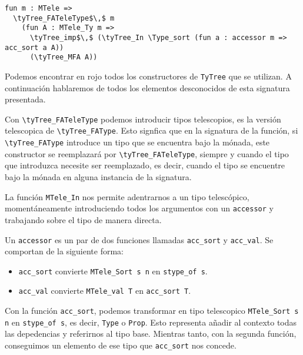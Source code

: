 \begin{lstlisting}[frame=tb,caption={\lstinline{ret} lifteado},label=lst:ret_lift_m]
fun m : MTele =>
  \tyTree_FATeleType$\,$ m
    (fun A : MTele_Ty m =>
      \tyTree_imp$\,$ (\tyTree_In \Type_sort (fun a : accessor m => acc_sort a A))
      (\tyTree_MFA A))
\end{lstlisting}

Podemos encontrar en rojo todos los constructores de \lstinline{TyTree} que se utilizan.
A continuación hablaremos de todos los elementos desconocidos de esta signatura presentada.

Con \lstinline{\tyTree_FATeleType} podemos introducir tipos telescopios, es la versión telescopica de \lstinline{\tyTree_FAType}. Esto signfica que en la signatura de la función, si \lstinline{\tyTree_FAType} introduce un tipo que se encuentra bajo la mónada, este constructor se reemplazará por \lstinline{\tyTree_FATeleType}, siempre y cuando el tipo que introduzca necesite ser reemplazado, es decir, cuando el tipo se encuentre bajo la mónada en alguna instancia de la signatura.

La función \lstinline{MTele_In} nos permite adentrarnos a un tipo telescópico, momentáneamente introduciendo todos los argumentos con un \lstinline{accessor} y trabajando sobre el tipo de manera directa.

Un \lstinline{accessor} es un par de dos funciones llamadas \lstinline{acc_sort} y \lstinline{acc_val}.
Se comportan de la siguiente forma:
\begin{itemize}
  \item \lstinline{acc_sort} convierte \lstinline{MTele_Sort s n} en \lstinline{stype_of s}.
  \item \lstinline{acc_val} convierte \lstinline{MTele_val T} en \lstinline{acc_sort T}.
\end{itemize}

Con la función \lstinline{acc_sort}, podemos transformar en tipo telescopico \lstinline{MTele_Sort s n} en \lstinline{stype_of s}, es decir, \lstinline{Type} o \lstinline{Prop}. Esto representa añadir al contexto todas las depedencias y referirnos al tipo base. Mientras tanto, con la segunda función, conseguimos un elemento de ese tipo que \lstinline{acc_sort} nos concede.


